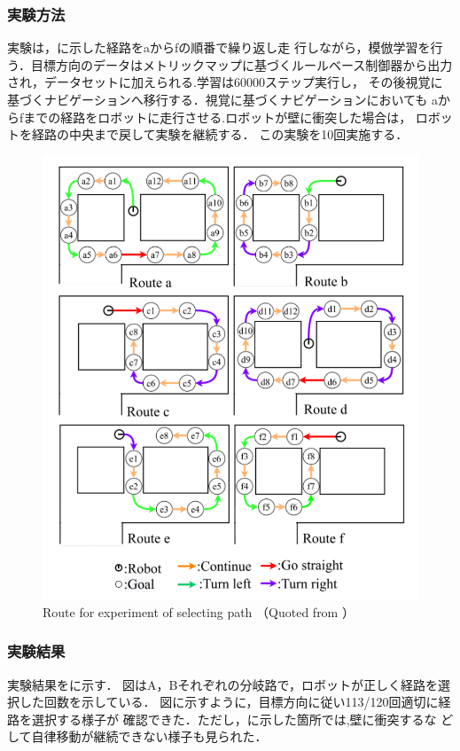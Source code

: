 \subsubsection{実験方法}
実験は，に示した経路をaからfの順番で繰り返し走
行しながら，模倣学習を行う．目標方向のデータはメトリックマップに基づくルールベース制御器から出力
され，データセットに加えられる.学習は60000ステップ実行し，
その後視覚に基づくナビゲーションへ移行する．視覚に基づくナビゲーションにおいても
aからfまでの経路をロボットに走行させる.ロボットが壁に衝突した場合は，
ロボットを経路の中央まで戻して実験を継続する．
この実験を10回実施する．

\begin{figure}[htbp]
    \centering
     \includegraphics[width=130mm]{images/pdf/haru_mech_route.pdf}
     \caption{Route for experiment of selecting path （Quoted from \cite{haruyama2022}）}
     \label{fig:haru_mech_route}
\end{figure}
\clearpage
\subsubsection{実験結果}
実験結果をに示す．
図はA，Bそれぞれの分岐路で，ロボットが正しく経路を選択した回数を示している．
図に示すように，目標方向に従い113/120回適切に経路を選択する様子が
確認できた．ただし，に示した箇所では,壁に衝突するな
どして自律移動が継続できない様子も見られた．

